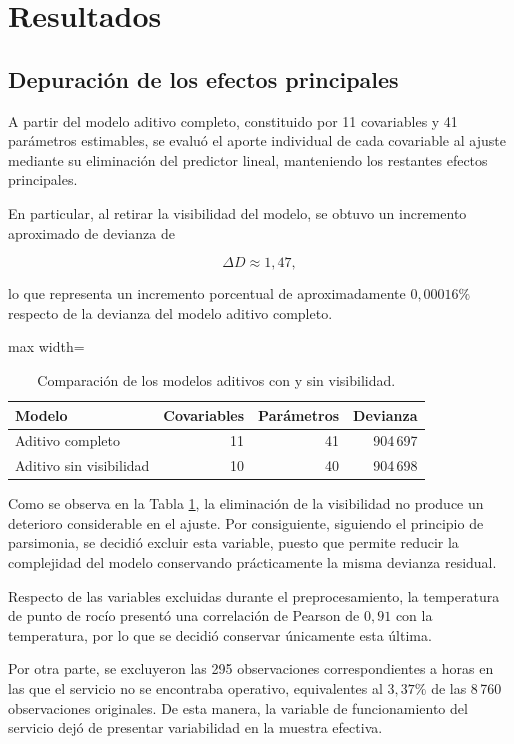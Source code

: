 \documentclass[12pt, a4paper]{article}
\numberwithin{equation}{section}
\begin{document}
\section{Resultados}

\subsection{Depuración de los efectos principales}

A partir del modelo aditivo completo, constituido por
11 covariables y 41 parámetros estimables, se evaluó
el aporte individual de cada covariable al ajuste
mediante su eliminación del predictor lineal,
manteniendo los restantes efectos principales.

En particular, al retirar la visibilidad del modelo,
se obtuvo un incremento aproximado de devianza de

\[
\Delta D \approx 1{,}47,
\]

lo que representa un incremento porcentual de
aproximadamente $0{,}00016\%$ respecto de la devianza
del modelo aditivo completo.

\begin{table}[htbp]
\centering
\caption{Comparación de los modelos aditivos con y
sin visibilidad.}
\label{tab:depuracion}
\begin{adjustbox}{max width=\linewidth}
\begin{tabular}{lrrr}
\toprule
Modelo & Covariables & Parámetros & Devianza \\
\midrule
Aditivo completo
& 11 & 41 & 904\,697 \\
Aditivo sin visibilidad
& 10 & 40 & 904\,698 \\
\bottomrule
\end{tabular}
\end{adjustbox}
\end{table}

Como se observa en la Tabla \ref{tab:depuracion},
la eliminación de la visibilidad no produce un
deterioro considerable en el ajuste. Por consiguiente,
siguiendo el principio de parsimonia, se decidió
excluir esta variable, puesto que permite reducir
la complejidad del modelo conservando prácticamente
la misma devianza residual.

Respecto de las variables excluidas durante el
preprocesamiento, la temperatura de punto de rocío
presentó una correlación de Pearson de $0{,}91$ con
la temperatura, por lo que se decidió conservar
únicamente esta última.

Por otra parte, se excluyeron las 295 observaciones
correspondientes a horas en las que el servicio no
se encontraba operativo, equivalentes al $3{,}37\%$
de las 8\,760 observaciones originales. De esta
manera, la variable de funcionamiento del servicio
dejó de presentar variabilidad en la muestra efectiva.
\end{document}
